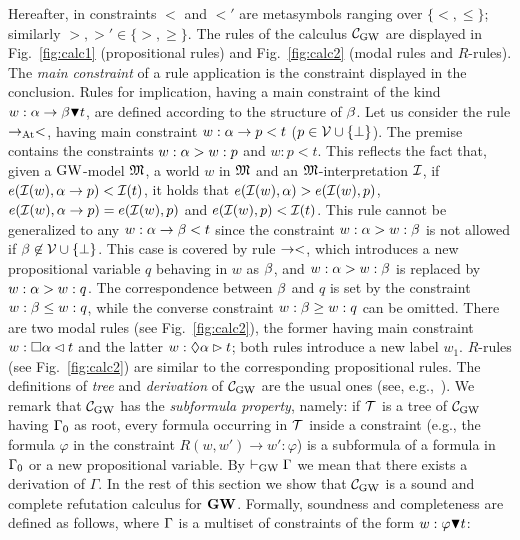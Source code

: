 Hereafter, in constraints $\lt$ and $\lt'$ are metasymbols ranging over
$\{<,\leq\}$; similarly $\gt,\gt' \in \{>,\geq\}$. The rules of the calculus
$\mathcal{C}_{\mathrm{GW}}$ are displayed in Fig.~\ref{fig:calc1} (propositional rules)
and Fig.~\ref{fig:calc2} (modal rules and $R$-rules).
The \emph{main constraint} of a rule application is the constraint
displayed in the conclusion.  Rules for implication, having a main
constraint of the kind $w:\alpha\to \beta\blacktriangledown t$, are defined
according to the structure of $\beta$.  Let us consider the rule
$\to_{\mathrm{At}}<$, having main constraint $w:\alpha\to p < t$
($p\in\mathcal{V}\cup\{\bot\}$). The premise contains the constraints $w:\alpha >
w:p$ and $w:p < t$.  This reflects the fact that, given a $\mbox{$\mathrm{GW}$}$-model
$\mathfrak{M}$, a world $w$ in $\mathfrak{M}$ and an $\mathfrak{M}$-interpretation $\mathcal{I}$, if
$e(\mathcal{I}(w), \alpha\to p) < \mathcal{I}(t)$, it holds that $e(\mathcal{I}(w),\alpha) >
e(\mathcal{I}(w),p)$, $e(\mathcal{I}(w), \alpha\to p) = e(\mathcal{I}(w),p)$ and
$e(\mathcal{I}(w),p) < \mathcal{I}(t)$.  This rule cannot be generalized to any
$w:\alpha\to \beta < t$ since the constraint $w:\alpha > w:\beta$ is not allowed if
$\beta\not\in\mathcal{V}\cup\{\bot\}$.  This case is covered by rule $\to<$,
which introduces a new propositional variable $q$ behaving in $w$ as
$\beta$, and $w:\alpha > w:\beta$ is replaced by $w:\alpha > w: q$.  The
correspondence between $\beta$ and $q$ is set by the constraint $w:\beta\leq
w:q$, while the converse constraint $w:\beta\geq w:q$ can be omitted.
There are two modal rules (see Fig.~\ref{fig:calc2}), the former
having main constraint $w:\Box\alpha \lhd t$ and the latter $w:\lozenge\alpha \rhd
t$; both rules introduce a new label $w_1$.  $R$-rules (see
Fig.~\ref{fig:calc2}) are similar to the corresponding propositional
rules.  The definitions of \emph{tree} and \emph{derivation} of
$\mathcal{C}_{\mathrm{GW}}$ are the usual ones (see, e.g.,~\cite{TroSch:00}).  We remark
that $\mathcal{C}_{\mathrm{GW}}$ has the \emph{subformula property}, namely: if $\mathcal{T}$
is a tree of $\mathcal{C}_{\mathrm{GW}}$ having $\Gamma_0$ as root, every formula occurring
in $\mathcal{T}$ inside a constraint (e.g., the formula $\varphi$ in the
constraint $R(w,w')\to w':\varphi$) is a subformula of a formula in
$\Gamma_0$ or a new propositional variable.  By $\vdash_{\mathrm{GW}} \Gamma$ we mean
that there exists a derivation of $\Gamma$.  In the rest of this
section we show that $\mathcal{C}_{\mathrm{GW}}$ is a sound and complete refutation
calculus for $\mathbf{GW}$. Formally, soundness and completeness are defined
as follows, where $\Gamma$ is a multiset of constraints of the form
$w:\varphi\blacktriangledown t$:

